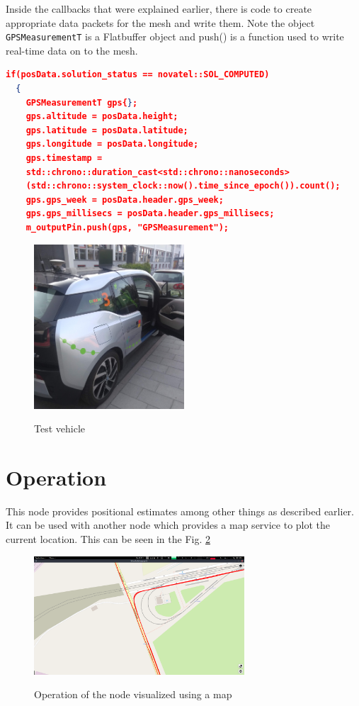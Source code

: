 \documentclass[a4paper, 12pt, oneside]{report}
\begin{document}
  Inside the callbacks that were explained earlier, there is code to create appropriate data packets for the mesh and write them. Note the object \texttt{GPSMeasurementT} is a Flatbuffer \cite{FlatBuffersFlatBuffers-2019-06-20} object and push() is a function used to write real-time data on to the mesh.
   
  \begin{lstlisting}[language=json,firstnumber=1]
  if(posData.solution_status == novatel::SOL_COMPUTED)
  {
    GPSMeasurementT gps{};
    gps.altitude = posData.height;
    gps.latitude = posData.latitude;
    gps.longitude = posData.longitude;
    gps.timestamp = 
    std::chrono::duration_cast<std::chrono::nanoseconds>
    (std::chrono::system_clock::now().time_since_epoch()).count();
    gps.gps_week = posData.header.gps_week;
    gps.gps_millisecs = posData.header.gps_millisecs;
    m_outputPin.push(gps, "GPSMeasurement");
  \end{lstlisting}  
  
   \begin{figure}[h]
      \caption{Test vehicle}
      \centering
      \includegraphics[width=0.5\textwidth]{Testvehicle}
      \label{fig:testVehicle}
  \end{figure}
   
  \section{Operation}
  This node provides positional estimates among other things as described earlier. It can be used with another node which provides a map service to plot the current location. This can be seen in the Fig. \ref{fig:gnsswithmap}
  
  \begin{figure}[h]
      \caption{Operation of the node visualized using a map}
      \centering
      \includegraphics[width=0.7\textwidth]{gnsswithmap}
      \label{fig:gnsswithmap}
  \end{figure}
\end{document}
